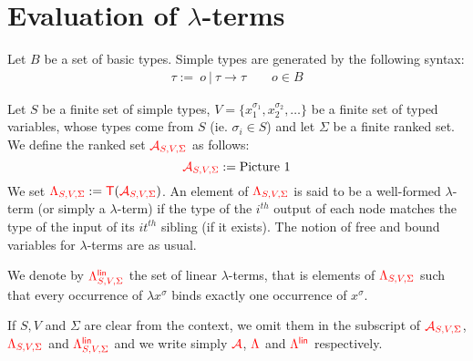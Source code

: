 \section{Evaluation of $\lambda$-terms}
\label{sec:eval}

 \newcommand{\rlambda}{\ranked{\Lambda}}
 \newcommand{\rlambdalin}{\ranked{\Lambda^{\sf{lin}}}}
 \newcommand{\rlambdathin}{\ranked{\Lambda^{\sf{thin}}}}
\newcommand{\pictureline}[2]{\\   \begin{minipage}{0,6\textwidth}
    #1 
\end{minipage} & \begin{minipage}{0,4\textwidth}#2\end{minipage} \\}

\begin{definition}
Let $B$ be a set of basic types. Simple types are generated by the following syntax: 
\begin{align*}
\tau:= \ o\ |\  \tau\rightarrow \tau \qquad o\in B
\end{align*}
\end{definition}

\begin{definition}
Let $S$ be a finite set of simple types, $V=\{x_1^{\sigma_1},x_2^{\sigma_2},\dots\}$ be a finite set of typed variables, whose types come from $S$ (ie. $\sigma_i \in S$) and let  $\Sigma$ be a finite ranked set. 
We define the ranked set ${\color{red}{\mathcal{A}_{S,V,\Sigma}}}$ as follows:
 $${\color{red}{\mathcal{A}_{S,V,\Sigma}}}:= \text{Picture 1} $$
We set ${\color{red}{\Lambda_{S,V,\Sigma}}}:={\color{red}{\mathsf T}}({\color{red}{\mathcal{A}_{S,V,\Sigma}}})$. An element of ${\color{red}{\Lambda_{S,V,\Sigma}}}$ is said to be a well-formed $\lambda$-term (or simply a $\lambda$-term) if the type of the $i^{th}$ output of each node matches the type of the input of its $it^{th}$ sibling (if it exists). The notion of free and bound variables for $\lambda$-terms are as usual.

\medskip
\noindent We denote by ${\color{red}{\Lambda^{\sf{lin}}_{S,V,\Sigma}}}$ the set of linear $\lambda$-terms, that is elements of ${\color{red}{\Lambda_{S,V,\Sigma}}}$ such that every occurrence of $\lambda x^\sigma$ binds exactly one occurrence of $x^\sigma$.

\medskip
\noindent If $S, V$ and $\Sigma$ are clear from the context, we omit them in the subscript of ${\color{red}{\mathcal{A}_{S,V,\Sigma}}}$, ${\color{red}{\Lambda_{S,V,\Sigma}}}$ and ${\color{red}{\Lambda^{\sf{lin}}_{S,V,\Sigma}}}$ and we write simply ${\color{red}{\mathcal{A}}}$, $\rlambda$ and $\rlambdalin$ respectively.
\end{definition}

